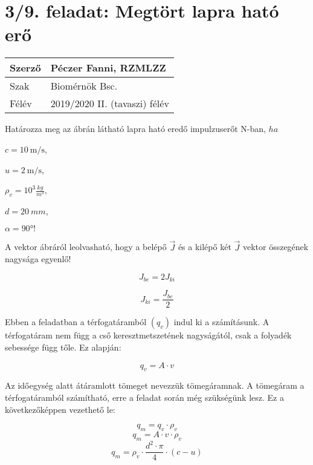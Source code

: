 \section*{3/9. feladat: Megtört lapra ható erő}
\begin{tabular}{ | p{2cm} | p{14cm} | } 
	\hline 
	Szerző & Péczer Fanni, RZMLZZ \\
	\hline
	Szak & Biomérnök Bsc. \\
	\hline	Félév & 2019/2020 II. (tavaszi) félév  \\
	\hline
\end{tabular}
\vspace{0.5cm}

\noindent Határozza meg az ábrán látható lapra ható eredő impulzuserőt N-ban, $ha$

$c=\SI{10}{\meter\per\second}$,

$u=\SI{2}{\meter\per\second}$,

$\rho_v=10^3 \frac{kg}{m^3}$,

$d=\SI{20}{mm}$,

$\alpha=90°!$



\noindent\hrulefill


\noindent A vektor ábráról leolvasható, hogy a belépő $\vec{J}$ és a kilépő két $\vec{J}$ vektor összegének nagysága egyenlő!

\begin{equation}
J_{be} = 2 J_{ki}
\end{equation}

\begin{equation}
J_{ki} = \frac{J_{be}}{2}
\end{equation}

\noindent Ebben a feladatban a térfogatáramból $(q_v)$ indul ki a számításunk. A térfogatáram nem függ a cső keresztmetszetének nagyságától, csak a folyadék sebessége függ tőle. Ez alapján:

\begin{equation}
q_v=A\cdot{v}
\end{equation}

\noindent Az időegység alatt átáramlott tömeget nevezzük tömegáramnak. A tömegáram a térfogatáramból számítható, erre a feladat során még szükségünk lesz. Ez a következőképpen vezethető le:

\begin{equation}
q_m=q_v\cdot{\rho_v}
\end{equation}
\begin{equation}
q_m=A\cdot{v}\cdot{\rho_v}
\end{equation}
\begin{equation}
q_m={\rho_v}\cdot{\frac{d^2\cdot{\pi}}{4}}\cdot(c-u)
\end{equation}


